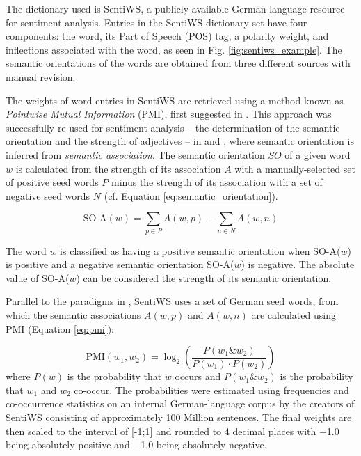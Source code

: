 \documentclass[10pt,twocolumn,twoside,lineno]{pnas-new}
\begin{document}
The dictionary used is SentiWS, a publicly available German-language resource for sentiment analysis. \cite{REMUS10.490} Entries in the SentiWS dictionary set have four components: the word, its Part of Speech (POS) tag, a polarity weight, and inflections associated with the word, as seen in Fig. \ref{fig:sentiws_example}. The semantic orientations of the words are obtained from three different sources with manual revision. 

The weights of word entries in SentiWS are retrieved using a method known as \emph{Pointwise Mutual Information} (PMI), first suggested in \cite{church-hanks-1990-word}. This approach was successfully re-used for sentiment analysis -- the determination of the semantic orientation and the strength of adjectives -- in \cite{Turney2002} and \cite{Turney2003}, where semantic orientation is inferred from \emph{semantic association}. The semantic orientation \(SO\) of a given word \(w\) is calculated from the strength of its association \(A\) with a manually-selected set of positive seed words \(P\) minus the strength of its association with a set of negative seed words \(N\) (cf. Equation \ref{eq:semantic_orientation}). 

\begin{equation}
\label{eq:semantic_orientation}
\text{SO-A}(w) = \sum_{p \in P}A(w,p) - \sum_{n \in N}A(w,n)
\end{equation}

The word \(w\) is classified as having a positive semantic orientation when SO-A(\(w\)) is positive and a negative semantic orientation SO-A(\(w\)) is negative. The absolute value of SO-A(\(w\)) can be considered the strength of its semantic orientation. 

Parallel to the paradigms in \cite{Turney2003}, SentiWS uses a set of German seed words, from which the semantic associations \(A(w,p)\) and \(A(w,n)\) are calculated using PMI (Equation \ref{eq:pmi}): 

\begin{equation}
\label{eq:pmi}
\text{PMI}(w_1,w_2) = \log_2\left(\frac{P(w_1 \& w_2)}{P(w_1) \cdot P(w_2)}\right)
\end{equation}
where \(P(w)\) is the probability that \(w\) occurs and \(P(w_1 \& w_2)\) is the probability that \(w_1\) and \(w_2\) co-occur. The probabilities were estimated using frequencies and co-occurrence statistics on an internal German-language corpus by the creators of SentiWS consisting of approximately 100 Million sentences. The final weights are then scaled to the interval of [-1;1] and rounded to 4 decimal places with +1.0 being absolutely positive and −1.0 being absolutely negative.
\end{document}
